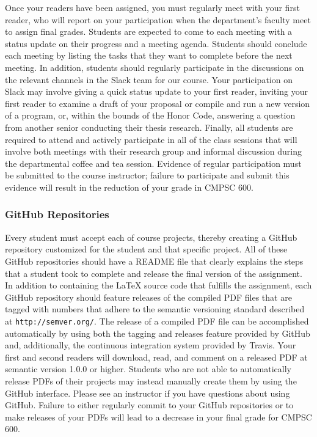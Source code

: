 \documentclass[11pt]{article}
\newcommand{\url}[1]{\lstinline{#1}}
\begin{document}
Once your readers have been assigned, you must regularly meet with your first
reader, who will report on your participation when the department's faculty meet
to assign final grades.  Students are expected to come to each meeting with a
status update on their progress and a meeting agenda.  Students should conclude
each meeting by listing the tasks that they want to complete before the next
meeting. In addition, students should regularly participate in the discussions
on the relevant channels in the Slack team for our course. Your participation on
Slack may involve giving a quick status update to your first reader, inviting
your first reader to examine a draft of your proposal or compile and run a new
version of a program, or, within the bounds of the Honor Code, answering a
question from another senior conducting their thesis research.  Finally, all
students are required to attend and actively participate in all of the class
sessions that will involve both meetings with their research group and informal
discussion during the departmental coffee and tea session. Evidence of regular
participation must be submitted to the course instructor; failure to participate
and submit this evidence will result in the reduction of your grade in CMPSC
600.

\subsubsection*{GitHub Repositories}

Every student must accept each of course projects, thereby creating a GitHub
repository customized for the student and that specific project. All of these
GitHub repositories should have a README file that clearly explains the steps
that a student took to complete and release the final version of the assignment.
In addition to containing the \LaTeX{} source code that fulfills the assignment,
each GitHub repository should feature releases of the compiled PDF files that
are tagged with numbers that adhere to the semantic versioning standard
described at \url{http://semver.org/}. The release of a compiled PDF file can be
accomplished automatically by using both the tagging and releases feature
provided by GitHub and, additionally, the continuous integration system provided
by Travis. Your first and second readers will download, read, and comment on a
released PDF at semantic version 1.0.0 or higher. Students who are not able to
automatically release PDFs of their projects may instead manually create them by
using the GitHub interface. Please see an instructor if you have questions about
using GitHub. Failure to either regularly commit to your GitHub repositories or
to make releases of your PDFs will lead to a decrease in your final grade for
CMPSC 600.
\end{document}
